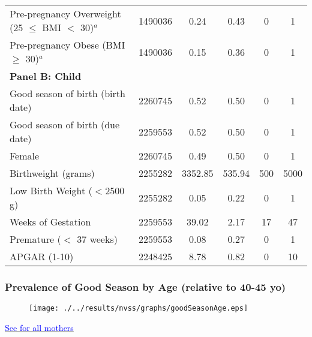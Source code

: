 \documentclass[10pt,letterpaper,subeqn]{beamer}
\begin{document}
\begin{frame}
\begin{table}[htpb!]
\begin{center}
{\begin{tabular}{lccccc}
Pre-pregnancy Overweight (25 $\leq$ BMI $<$ 30)$^{a}$&     1490036&        0.24&        0.43&           0&           1\\

Pre-pregnancy Obese (BMI $\geq$ 30)$^{a}$&     1490036&        0.15&        0.36&           0&           1\\


 \multicolumn{6}{l}{\textbf{Panel B: Child}}\\
 Good season of birth (birth date)&     2260745&        0.52&        0.50&           0&           1\\
Good season of birth (due date)&     2259553&        0.52&        0.50&           0&           1\\
Female              &     2260745&        0.49&        0.50&           0&           1\\
Birthweight (grams) &     2255282&     3352.85&      535.94&         500&        5000\\
Low Birth Weight ($<$2500 g)&     2255282&        0.05&        0.22&           0&           1\\
Weeks of Gestation  &     2259553&       39.02&        2.17&          17&          47\\
Premature ($<$ 37 weeks)&     2259553&        0.08&        0.27&           0&           1\\
APGAR (1-10)        &     2248425&        8.78&        0.82&           0&          10\\

\bottomrule
 \end{tabular}}
\end{center}\end{table}
\end{frame}




\begin{frame}[label=ages]
\frametitle{Prevalence of Good Season by Age (relative to 40-45 yo)}
\begin{figure}[htpb!]
  \centering
  \texttt{[image: ./../results/nvss/graphs/goodSeasonAge.eps]} \\
\end{figure}
\hyperlink{agesAll}{\textcolor{blue}{See for all mothers}}
\end{frame}
\end{document}
